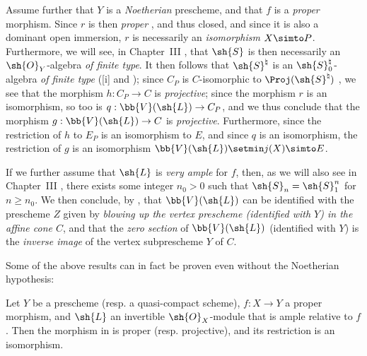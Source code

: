 \begin{remark}[8.8.3]
\label{II.8.8.3}
Assume further that $Y$ is a \emph{Noetherian} prescheme, and that $f$ is a \emph{proper} morphism.
Since $r$ is then \emph{proper} , and thus closed, and since it is also a dominant open immersion, $r$ is necessarily an \emph{isomorphism} $X\simto P$.
Furthermore, we will see, in Chapter~III , that $\sh{S}$ is then necessarily an $\sh{O}_Y$-algebra \emph{of finite type}.
It then follows that $\sh{S}^\natural$ is an $\sh{S}_0^\natural$-algebra \emph{of finite type} ([i] and );
since $C_P$ is $C$-isomorphic to $\Proj(\sh{S}^\natural)$ , we see that the morphism $h:C_P\to C$ is \emph{projective};
since the morphism $r$ is an isomorphism, so too is $q:\bb{V}(\sh{L})\to C_P$, and we thus conclude that the morphism $g:\bb{V}(\sh{L})\to C$ is \emph{projective}.
Furthermore, since the restriction of $h$ to $E_P$ is an isomorphism to $E$, and since $q$ is an isomorphism, the restriction  of $g$ is an isomorphism $\bb{V}(\sh{L})\setmin j(X)\simto E$.

If we further assume that $\sh{L}$ is \emph{very ample} for $f$, then, as we will also see in Chapter~III , there exists some integer $n_0>0$ such that $\sh{S}_n=\sh{S}_1^n$ for $n\geq n_0$.
We then conclude, by , that $\bb{V}(\sh{L})$ can be identified with the prescheme $Z$ given by \emph{blowing up the vertex prescheme \emph{(identified with $Y$)} in the affine cone $C$}, and that the \emph{zero section} of $\bb{V}(\sh{L})$ (identified with $Y$) is the \emph{inverse image} of the vertex subprescheme $Y$ of $C$.

Some of the above results can in fact be proven even without the Noetherian hypothesis:
\end{remark}
\begin{corollary}[8.8.4]
\label{II.8.8.4}
Let $Y$ be a prescheme (resp. a quasi-compact scheme), $f:X\to Y$ a proper morphism, and $\sh{L}$ an invertible $\sh{O}_X$-module that is ample relative to $f$.
Then the morphism in  is proper (resp. projective), and its restriction  is an isomorphism.
\end{corollary}

